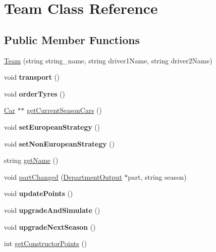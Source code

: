 \hypertarget{classTeam}{}\section{Team Class Reference}
\label{classTeam}
\subsection*{Public Member Functions}
\begin{DoxyCompactItemize}
\item 
\hyperlink{classTeam_acb3e8e4707763829d17d70b26deaee34}{Team} (string string\+\_\+name, string driver1\+Name, string driver2\+Name)
\item 
\mbox{\label{classTeam_a21681f514dea00fe6bca432ef64eab1e}} 
void {\bfseries transport} ()
\item 
\mbox{\label{classTeam_a6bf3c6839b7d2e4b38fbb160c41a40ab}} 
void {\bfseries order\+Tyres} ()
\item 
\hyperlink{classCar}{Car} $\ast$$\ast$ \hyperlink{classTeam_a8e71e64acc74a3346e373dde33f08233}{get\+Current\+Season\+Cars} ()
\item 
\mbox{\label{classTeam_a1fad6776814f2caf74088ee644435ae1}} 
void {\bfseries set\+European\+Strategy} ()
\item 
\mbox{\label{classTeam_a0eb5e6b897c90aa5026be4a0822c9fa5}} 
void {\bfseries set\+Non\+European\+Strategy} ()
\item 
string \hyperlink{classTeam_ab21736a411213da36d08210e570ecbeb}{get\+Name} ()
\item 
void \hyperlink{classTeam_add32843daa734d808b93e5a9793b158a}{part\+Changed} (\hyperlink{classDepartmentOutput}{Department\+Output} $\ast$part, string season)
\item 
\mbox{\label{classTeam_a013d81d7848893aef82a0e701b26777c}} 
void {\bfseries update\+Points} ()
\item 
\mbox{\label{classTeam_adc73729b63d1a52595c60f9e29d6e429}} 
void {\bfseries upgrade\+And\+Simulate} ()
\item 
\mbox{\label{classTeam_aedf4b8a3cd9edb5349b2b1d7dd965a2f}} 
void {\bfseries upgrade\+Next\+Season} ()
\item 
int \hyperlink{classTeam_ab34663d641e1fee1e3d924b8e0f17eb9}{get\+Constructor\+Points} ()
\end{DoxyCompactItemize}


